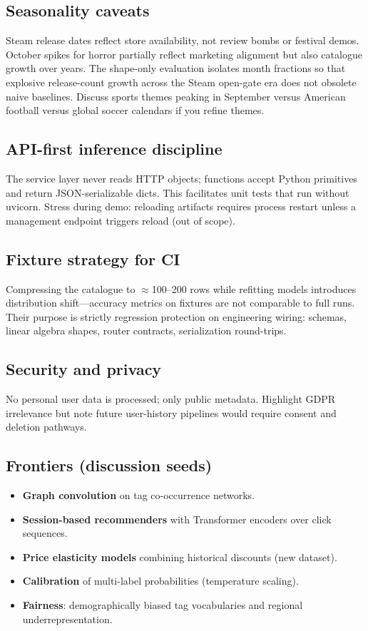\subsection{Seasonality caveats}
Steam release dates reflect store availability, not review bombs or festival demos. October spikes for horror partially reflect marketing alignment but also catalogue growth over years. The shape-only evaluation isolates month fractions so that explosive release-count growth across the Steam open-gate era does not obsolete naive baselines. Discuss sports themes peaking in September versus American football versus global soccer calendars if you refine themes.

\subsection{API-first inference discipline}
The service layer never reads HTTP objects; functions accept Python primitives and return JSON-serializable dicts. This facilitates unit tests that run without uvicorn. Stress during demo: reloading artifacts requires process restart unless a management endpoint triggers reload (out of scope).

\subsection{Fixture strategy for CI}
Compressing the catalogue to $\approx$100--200 rows while refitting models introduces distribution shift---accuracy metrics on fixtures are not comparable to full runs. Their purpose is strictly regression protection on engineering wiring: schemas, linear algebra shapes, router contracts, serialization round-trips.

\subsection{Security and privacy}
No personal user data is processed; only public metadata. Highlight GDPR irrelevance but note future user-history pipelines would require consent and deletion pathways.

\subsection{Frontiers (discussion seeds)}
\begin{itemize}
\item \textbf{Graph convolution} on tag co-occurrence networks.
\item \textbf{Session-based recommenders} with Transformer encoders over click sequences.
\item \textbf{Price elasticity models} combining historical discounts (new dataset).
\item \textbf{Calibration} of multi-label probabilities (temperature scaling).
\item \textbf{Fairness}: demographically biased tag vocabularies and regional underrepresentation.
\end{itemize}

